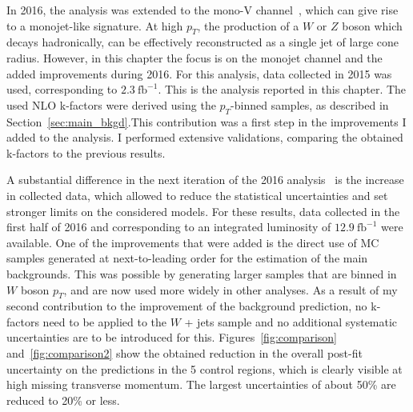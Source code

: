 In 2016, the analysis was extended to the mono-V channel~\cite{CMS:2016tns}, which can give rise to a monojet-like signature. At high $p_T$, the production of a $W$ or $Z$ boson which decays hadronically, can be effectively reconstructed as a single jet of large cone radius. However, in this chapter the focus is on the monojet channel and the added improvements during 2016. For this analysis, data collected in 2015 was used, corresponding to $2.3\ \mathrm{fb}^{-1}$. This is the analysis reported in this chapter.  The used \ac{NLO} k-factors were derived using the $p_T$-binned samples, as described in Section~\ref{sec:main_bkgd}.This contribution was a first step in the improvements I added to the analysis. I performed extensive validations, comparing the obtained k-factors to the previous results. 

A substantial difference in the next iteration of the 2016 analysis~\cite{Sirunyan:2017hci} is the increase in collected data, which allowed to reduce the statistical uncertainties and set stronger limits on the considered models. For these results, data collected in the first half of 2016 and corresponding to an integrated luminosity of $12.9\ \mathrm{fb}^{-1}$ were available. One of the improvements that were added is the direct use of MC samples generated at next-to-leading order for the estimation of the main backgrounds. This was possible by generating larger samples that are binned in $W$ boson $p_T$, and are now used more widely in other analyses. As a result of my second contribution to the improvement of the background prediction, no k-factors need to be applied to the $W$ + jets sample and no additional systematic uncertainties are to be introduced for this. Figures~\ref{fig:comparison} and~\ref{fig:comparison2} show the obtained reduction in the overall post-fit uncertainty on the predictions in the 5 control regions, which is clearly visible at high missing transverse momentum. The largest uncertainties of about 50\% are reduced to 20\% or less.

